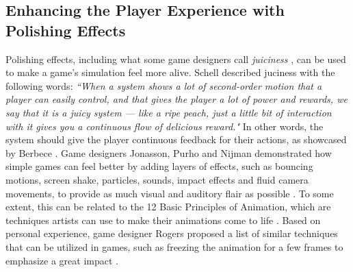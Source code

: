 
\subsection{Enhancing the Player Experience with Polishing Effects}
Polishing effects, including what some game designers call \textit{juiciness} \cite{juice3}, can be used to make a game's simulation feel more alive. Schell described juciness with the following words: \textit{``When a system shows a lot of second-order motion that a player can easily control, and that gives the player a lot of power and rewards, we say that it is a juicy system --- like a ripe peach, just a little bit of interaction with it gives you a continuous flow of delicious reward."} \cite{schell_art_2008} In other words, the system should give the player continuous feedback for their actions, as showcased by Berbece \cite{animationSucks}. Game designers Jonasson, Purho and Nijman demonstrated how simple games can feel better by adding layers of effects, such as bouncing motions, screen shake, particles, sounds, impact effects and fluid camera movements, to provide as much visual and auditory flair as possible \cite{juice1, juice2}. To some extent, this can be related to the 12 Basic Principles of Animation, which are techniques artists can use to make their animations come to life \cite{animation}. Based on personal experience, game designer Rogers proposed a list of similar techniques that can be utilized in games, such as freezing the animation for a few frames to emphasize a great impact \cite{sticky}.


